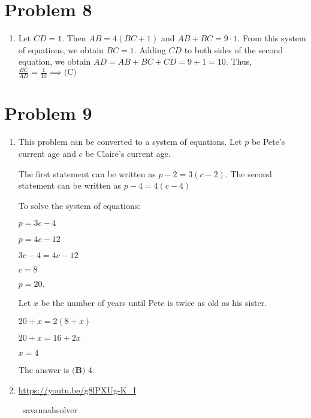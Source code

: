 \documentclass{article}%
\begin{document}
%
\section*{Problem 8}%
\label{sec:Problem8}%
\begin{enumerate}%
\item%
Let $CD = 1$. Then $AB = 4(BC + 1)$ and $AB + BC = 9\cdot1$. From this system of equations, we obtain $BC = 1$. Adding $CD$ to both sides of the second equation, we obtain $AD = AB + BC + CD = 9 + 1 = 10$.  Thus, $\frac{BC}{AD} = \frac{1}{10} \implies\text{(C)}$

%
\end{enumerate}

%
\section*{Problem 9}%
\label{sec:Problem9}%
\begin{enumerate}%
\item%
This problem can be converted to a system of equations. Let $p$ be Pete's current age and $c$ be Claire's current age. 

The first statement can be written as $p-2=3(c-2)$. The second statement can be written as $p-4=4(c-4)$

To solve the system of equations:


$p=3c-4$

$p=4c-12$

$3c-4=4c-12$

$c=8$

$p=20.$

Let $x$ be the number of years until Pete is twice as old as his sister.

$20+x=2(8+x)$

$20+x=16+2x$

$x=4$

The answer is $\boxed{\textbf{(B) }4}$.

%
\item%
\href{https://youtu.be/g8lPXUg-K_I}{https://youtu.be/g8lPXUg-K\_I}

~savannahsolver

%
\end{enumerate}

%
\end{document}
